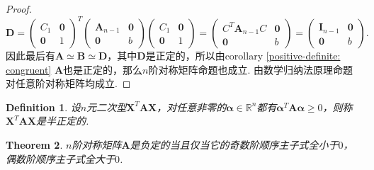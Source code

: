 \documentclass{article}
\newtheorem{theorem}{Theorem}[section]
\newtheorem{definition}[theorem]{Definition}
\newcommand{\mbf}[1]{\bm{#1}}
\begin{document}
\begin{proof}
$$
\mbf{D} = 
\begin{pmatrix}
C_1 & \mbf{0}\\
\mbf{0} & 1
\end{pmatrix}^T
\begin{pmatrix}
\mbf{A}_{n-1} & \mbf{0} \\
\mbf{0} & b
\end{pmatrix}\begin{pmatrix}
C_1 & \mbf{0}\\
\mbf{0} & 1
\end{pmatrix} = \begin{pmatrix}
C^T\mbf{A}_{n-1}C & \mbf{0} \\
\mbf{0} & b
\end{pmatrix} = \begin{pmatrix}
\mbf{I}_{n-1} & \mbf{0} \\
\mbf{0} & b
\end{pmatrix}.
$$
因此最后有$\mbf{A} \simeq \mbf{B} \simeq \mbf{D}$，其中$\mbf{D}$是正定的，所以由corollary \ref{positive-definite: congruent} $\mbf{A}$也是正定的，那么$n$阶对称矩阵命题也成立. 由数学归纳法原理命题对任意阶对称矩阵均成立.
\end{proof}

\begin{definition}
\rm 设$n$元二次型$\mbf{X}^T\mbf{A}\mbf{X}$，对任意非零的$\mbf{\alpha} \in \mathbb{R}^n$都有$\mbf{\alpha}^T \mbf{A} \mbf{\alpha} \geq 0$，则称$\mbf{X}^T\mbf{A}\mbf{X}$是{\color{red}半正定}的.
\end{definition}

\begin{theorem}
\rm $n$阶对称矩阵$\mbf{A}$是负定的当且仅当它的奇数阶顺序主子式全小于$0$，偶数阶顺序主子式全大于$0$. 
\end{theorem}
\end{document}
